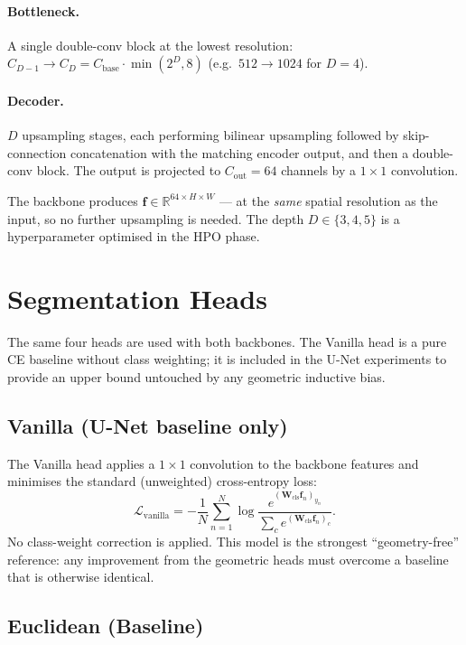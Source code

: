 \documentclass[12pt,a4paper]{article}
\newcommand{\R}{\mathbb{R}}
\theoremstyle{definition}
\begin{document}
\paragraph{Bottleneck.}
A single double-conv block at the lowest resolution:
$C_{D-1} \to C_D = C_{\text{base}} \cdot \min(2^D, 8)$
(e.g.\ $512 \to 1024$ for $D = 4$).

\paragraph{Decoder.}
$D$ upsampling stages, each performing bilinear upsampling followed by
skip-connection concatenation with the matching encoder output, and then a
double-conv block.  The output is projected to $C_{\text{out}} = 64$
channels by a $1 \times 1$ convolution.

The backbone produces $\mathbf{f} \in \R^{64 \times H \times W}$ — at the
\emph{same} spatial resolution as the input, so no further upsampling is
needed.  The depth $D \in \{3,4,5\}$ is a hyperparameter optimised in the
HPO phase.

\section{Segmentation Heads}

The same four heads are used with both backbones.  The Vanilla head is a
pure CE baseline without class weighting; it is included in the U-Net
experiments to provide an upper bound untouched by any geometric inductive
bias.

\subsection{Vanilla (U-Net baseline only)}\label{sec:vanilla}

The Vanilla head applies a $1\times1$ convolution to the backbone features
and minimises the standard (unweighted) cross-entropy loss:
\[
  \mathcal{L}_{\text{vanilla}}
  = -\frac{1}{N}\sum_{n=1}^{N}\log\frac{e^{(\mathbf{W}_{\text{cls}}\mathbf{f}_n)_{y_n}}}
    {\sum_c e^{(\mathbf{W}_{\text{cls}}\mathbf{f}_n)_c}}.
\]
No class-weight correction is applied.  This model is the strongest
``geometry-free'' reference: any improvement from the geometric heads must
overcome a baseline that is otherwise identical.

\subsection{Euclidean (Baseline)}
\end{document}

